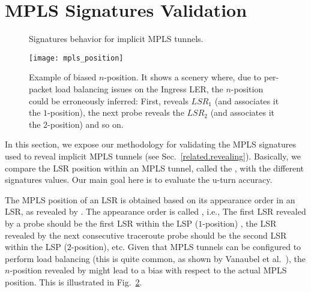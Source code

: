 \section{MPLS Signatures Validation}\label{validation}
\begin{figure}[!t]
  \begin{center}
\hspace{-0.3cm}      
  \end{center}
  \caption{Signatures behavior for implicit MPLS tunnels.}
  \label{validation.signatures.fig}
\end{figure}

\begin{figure}[!t]
  \begin{center}
    \texttt{[image: mpls\_position]}
  \end{center}
  \caption{Example of biased $n$-position. 
  It shows a scenery where, due to per-packet load balancing issues on the
  Ingress LER, the $n$-position could be erroneously inferred: First,
  \traceroute reveals  $LSR_{1}$ (and associates it the $1$-position), the next
  \traceroute probe reveals the $LSR_{2}$ (and associates it the $2$-position)
  and so on.}
  \label{validation.MPLSpositionFig}
\end{figure}

In this section, we expose our methodology for validating the MPLS signatures
used to reveal implicit MPLS tunnels (see Sec.~\ref{related.revealing}).
Basically, we compare the LSR position within an MPLS tunnel, called the
, with the different signatures values. Our main goal here is
to evaluate the u-turn accuracy.

The MPLS position of an LSR is obtained based on its appearance order in an LSR,
as revealed by \traceroute.  The appearance order is called ,
i.e., The first LSR revealed by a \traceroute probe should be the first LSR
within the LSP ($1$-position) , the LSR revealed by the next consecutive
traceroute probe should be the second LSR within the LSP ($2$-position), etc.
Given that MPLS tunnels can be configured to perform load balancing (this is
quite common, as shown by Vanaubel et al.~\cite{Vanaubel15}), the $n$-position
revealed by \traceroute might lead to a bias with respect to the actual MPLS
position. This is illustrated in Fig.~\ref{validation.MPLSpositionFig}.

